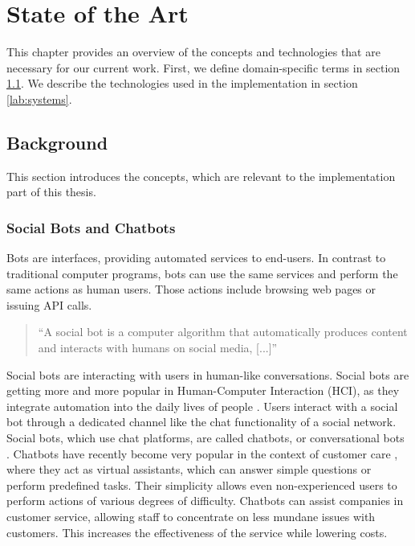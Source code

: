 \chapter{State of the Art}
This chapter provides an overview of the concepts and technologies that are necessary for our current work. First, we define domain-specific terms in section \ref{lab:background}. We describe the technologies used in the implementation in section \ref{lab:systems}.

\section{Background} \label{lab:background}

This section introduces the concepts, which are relevant to the implementation part of this thesis.

\subsection{Social Bots and Chatbots}\label{sec:chatbots}
Bots are interfaces, providing automated services to end-users.
In contrast to traditional computer programs, bots can use the same services and perform the same actions as human users. Those actions include browsing web pages or issuing API calls.
\begin{quote}
    ``A social bot is a computer algorithm that automatically produces content and interacts with humans on social media, [...]'' \cite{FVD*16b}
\end{quote}
Social bots are interacting with users in human-like conversations.
Social bots are getting more and more popular in Human-Computer Interaction (HCI), as they integrate automation into the daily lives of people \cite{BFPN17}. Users interact with a social bot through a dedicated channel like the chat functionality of a social network.
Social bots, which use chat platforms, are called chatbots, or conversational bots \cite{WWX*16,AAA17}.
Chatbots have recently become very popular in the context of customer care \cite{CHW*17,FVD*16b}, where they act as virtual assistants, which can answer simple questions \cite{CaWh14} or perform predefined tasks. 
Their simplicity allows even non-experienced users to perform actions of various degrees of difficulty. 
Chatbots can assist companies in customer service, allowing staff to concentrate on less mundane issues with customers. This increases the effectiveness of the service while lowering costs. \cite{AAA17}

